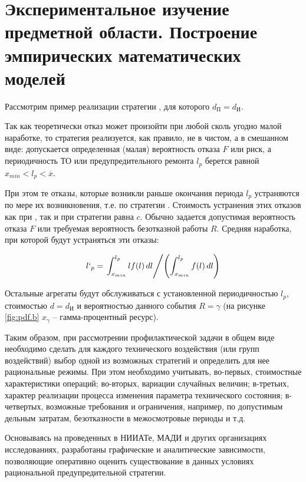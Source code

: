 \documentclass[../nirs.tex]{subfiles}
\begin{document}
\section{Экспериментальное изучение предметной области. Построение эмпирических
математических моделей}

Рассмотрим пример реализации стратегии , для которого $d_\text{П} =
d_\text{И}$.

Так как теоретически отказ может произойти при любой сколь угодно малой
наработке, то стратегия  реализуется, как правило, не в чистом, а в
смешанном виде: допускается определенная (малая) вероятность отказа $F$ или
риск, а периодичность ТО или предупредительного ремонта $l_p$ берется равной
$x_{min} < l_p < \overline{x}$.

При этом те отказы, которые возникли раньше окончания периода $l_p$ устраняются
по мере их возникновения, т.е. по стратегии . Стоимость устранения этих
отказов как при , так и при  стратегии равна $c$. Обычно задается
допустимая вероятность отказа $F$ или требуемая вероятность безотказной работы
$R$. Средняя наработка, при которой будут устраняться эти отказы:

\begin{equation*}
    l`_p =
    \left.
    \int_{x_{min}}^{l_p} lf(l)\,dl
    \middle/
    \left( \int_{x_{min}}^{l_p} f(l)\,dl \right)
    \right.
\end{equation*}

Остальные агрегаты будут обслуживаться с установленной периодичностью $l_p$,
стоимостью $d = d_\text{И}$ и вероятностью данного события $R = \gamma$ (на
рисунке \ref{fig:pdf.b} $x_\gamma$ -- гамма-процентный ресурс).

Таким образом, при рассмотрении профилактической задачи в общем виде необходимо
сделать для каждого технического воздействия (или групп воздействий) выбор
одной из возможных стратегий и определить для нее рациональные режимы. При этом
необходимо учитывать, во-первых, стоимостные характеристики операций;
во-вторых, вариации случайных величин; в-третьих, характер реализации процесса
изменения параметра технического состояния; в-четвертых, возможные требования и
ограничения, например, по допустимым дельным затратам, безотказности в
межосмотровые периоды и т.д.

Основываясь на проведенных в НИИАТе, МАДИ и других организациях исследованиях,
разработаны графические и аналитические зависимости, позволяющие оперативно
оценить существование в данных условиях рациональной предупредительной
стратегии.
\end{document}
